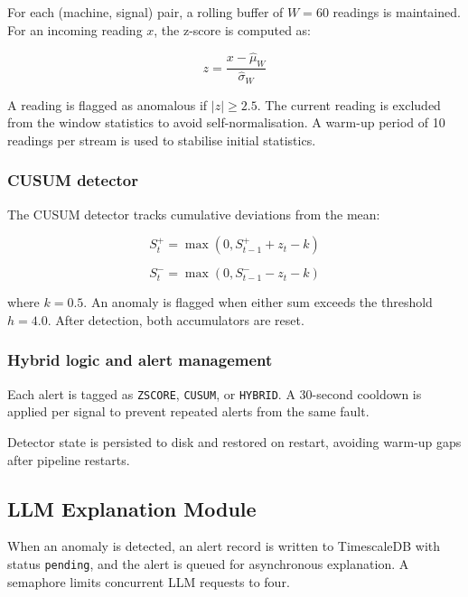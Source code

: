 \documentclass[11pt, a4paper]{article}
\begin{document}
For each (machine, signal) pair, a rolling buffer of $W = 60$ readings 
is maintained. For an incoming reading $x$, the z-score is computed as:

\begin{equation}
    z = \frac{x - \hat{\mu}_W}{\hat{\sigma}_W}
\end{equation}

A reading is flagged as anomalous if $|z| \geq 2.5$. The current reading 
is excluded from the window statistics to avoid self-normalisation. A 
warm-up period of 10 readings per stream is used to stabilise initial 
statistics.

\subsubsection{CUSUM detector}

The CUSUM detector tracks cumulative deviations from the mean:

\begin{equation}
    S_t^{+} = \max(0, S_{t-1}^{+} + z_t - k)
\end{equation}

\begin{equation}
    S_t^{-} = \max(0, S_{t-1}^{-} - z_t - k)
\end{equation}

where $k = 0.5$. An anomaly is flagged when either sum exceeds the 
threshold $h = 4.0$. After detection, both accumulators are reset.

\subsubsection{Hybrid logic and alert management}

Each alert is tagged as \texttt{ZSCORE}, \texttt{CUSUM}, or 
\texttt{HYBRID}. A 30-second cooldown is applied per signal to prevent 
repeated alerts from the same fault.

Detector state is persisted to disk and restored on restart, avoiding 
warm-up gaps after pipeline restarts.

\subsection{LLM Explanation Module}

When an anomaly is detected, an alert record is written to TimescaleDB 
with status \texttt{pending}, and the alert is queued for asynchronous 
explanation. A semaphore limits concurrent LLM requests to four.
\end{document}
